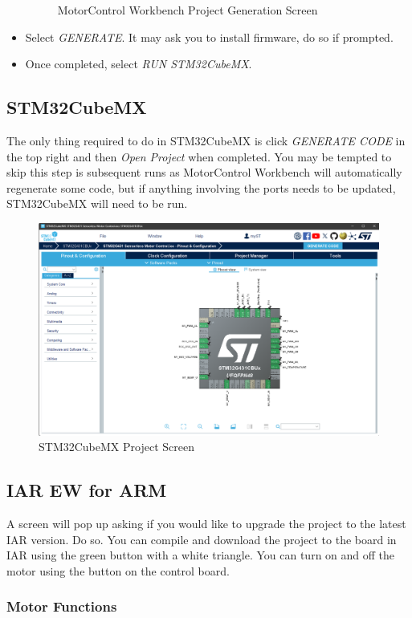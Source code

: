 \documentclass[10pt]{article}
\begin{document}
\begin{itemize}
\begin{figure}[H]
                        \caption{MotorControl Workbench Project Generation Screen}
                    \end{figure}
                \item Select \emph{GENERATE}. It may ask you to install firmware, do so if prompted.
                \item Once completed, select \emph{RUN STM32CubeMX}.
            \end{itemize}
		\FloatBarrier \subsection{STM32CubeMX}
            The only thing required to do in STM32CubeMX is click \emph{GENERATE CODE} in the top right and then \emph{Open Project} when completed. You may be tempted to skip this step is subsequent runs as MotorControl Workbench will automatically regenerate some code, but if anything involving the ports needs to be updated, STM32CubeMX will need to be run.
            \begin{figure}[H]
                \centerline{\includegraphics[width=\textwidth]{References/CubeMX.png}}
                \caption{STM32CubeMX Project Screen}
            \end{figure}
		\FloatBarrier \subsection{IAR EW for ARM}
            A screen will pop up asking if you would like to upgrade the project to the latest IAR version. Do so. You can compile and download the project to the board in IAR using the green button with a white triangle. You can turn on and off the motor using the button on the control board.
			\FloatBarrier \subsubsection{Motor Functions}
\end{document}
